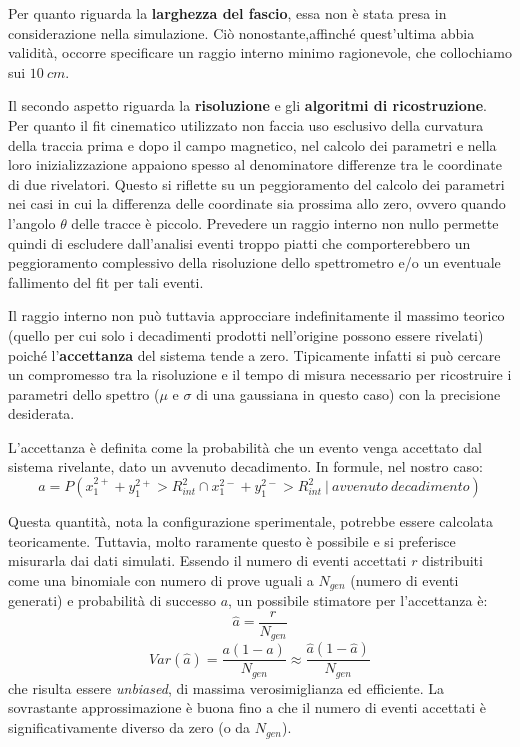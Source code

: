 \documentclass[8pt]{extarticle}
\begin{document}
Per quanto riguarda la \textbf{larghezza del fascio}, essa non è stata presa in considerazione nella simulazione. Ciò nonostante,affinché quest'ultima abbia validità, occorre specificare un raggio interno minimo ragionevole, che collochiamo sui $10\ cm$. \medskip	

Il secondo aspetto riguarda la \textbf{risoluzione} e gli \textbf{algoritmi di ricostruzione}. Per quanto il fit cinematico utilizzato non faccia uso esclusivo della curvatura della traccia prima e dopo il campo magnetico, nel calcolo dei parametri e nella loro inizializzazione appaiono spesso al denominatore differenze tra le coordinate di due rivelatori. Questo si riflette su un peggioramento del calcolo dei parametri nei casi in cui la differenza delle coordinate sia prossima allo zero, ovvero quando l'angolo $\theta$ delle tracce è piccolo. Prevedere un raggio interno non nullo permette quindi di escludere dall'analisi eventi troppo piatti che comporterebbero un peggioramento complessivo della risoluzione dello spettrometro e/o un eventuale fallimento del fit per tali eventi. \medskip

Il raggio interno non può tuttavia approcciare indefinitamente il massimo teorico (quello per cui solo i decadimenti prodotti nell'origine possono essere rivelati) poiché l'\textbf{accettanza} del sistema tende a zero. Tipicamente infatti si può cercare un compromesso tra la risoluzione e il tempo di misura necessario per ricostruire i parametri dello spettro ($\mu$ e $\sigma$ di una gaussiana in questo caso) con la precisione desiderata. \medskip

L'accettanza è definita come la probabilità che un evento venga accettato dal sistema rivelante, dato un avvenuto decadimento. In formule, nel nostro caso: \\
$$
a = P(x_1^{2+} + y_1^{2+} > R_{int}^2 \cap x_1^{2-} + y_1^{2-} > R_{int}^2\ |\ avvenuto\ decadimento)
$$

Questa quantità, nota la configurazione sperimentale, potrebbe essere calcolata teoricamente. Tuttavia, molto raramente questo è possibile e si preferisce misurarla dai dati simulati. Essendo il numero di eventi accettati $r$ distribuiti come una binomiale con numero di prove uguali a $N_{gen}$ (numero di eventi generati) e probabilità di successo $a$, un possibile stimatore per l'accettanza è: 
$$
\hat{a} = \frac{r}{N_{gen}}
$$
$$
Var(\hat{a}) = \frac{a(1-a)}{N_{gen}} \approx \frac{\hat{a}(1-\hat{a})}{N_{gen}}
$$
che risulta essere \textit{unbiased}, di massima verosimiglianza ed efficiente. La sovrastante approssimazione è buona fino a che il numero di eventi accettati è significativamente diverso da zero (o da $N_{gen}$). 
\end{document}
